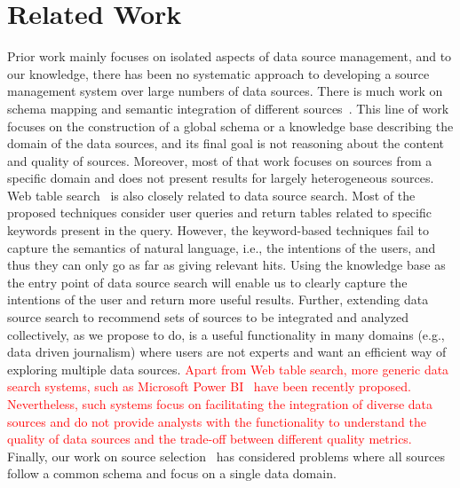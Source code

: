 \documentclass{sig-alternate}
\begin{document}
\section{Related Work}
\label{sec:related}
Prior work mainly focuses on isolated aspects of data source management, and to our knowledge, there has been no systematic approach to developing a source management system over large numbers of data sources. There is much work on schema mapping and semantic integration of different
sources~\cite{cafarella:2009,venetis:11, oktie:13}. This line of work focuses on the construction of a global schema or a knowledge base describing the domain of the data sources, and its final goal is not reasoning about the content and quality of sources. Moreover, most of that work focuses on sources from a specific domain and does not present results for largely heterogeneous sources. Web table search~\cite{cafarella:2009,limaye:2010, dassarma:2012,yakout:2012, fan:2014} is also closely related to data source search. Most of the proposed techniques consider user queries and return tables related to specific keywords present in the query. However, the keyword-based techniques fail to capture the semantics of natural language, i.e., the intentions of the users, and thus they can only go as far as giving relevant hits. Using the knowledge base as the entry point of data source search will enable us to clearly capture the intentions of the user and return more useful results. Further, extending data source search to recommend sets of sources to be integrated and analyzed collectively, as we propose to do, is a useful functionality in many domains (e.g., data driven journalism) where users are not experts and want an efficient way of exploring multiple data sources. \textcolor{red}{Apart from Web table search, more generic data search systems, such as Microsoft Power BI~\cite{powerbi} have been recently proposed. Nevertheless, such systems focus on facilitating the integration of diverse data sources and do not provide analysts with the functionality to understand the quality of data sources and the trade-off between different quality metrics.} Finally, our work on source selection~\cite{dong:vldb13, rekatsinas:2014} has considered problems where all sources follow a common schema and focus on a single data domain.
\end{document}
